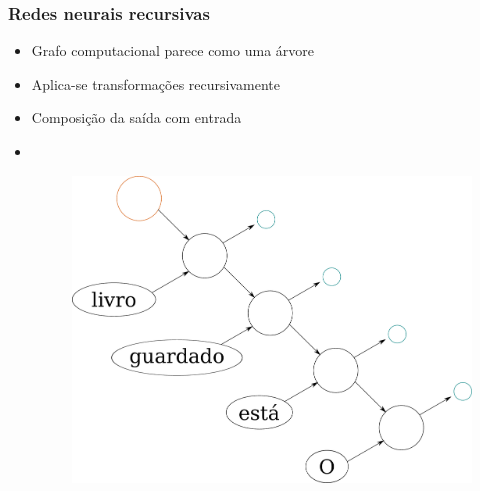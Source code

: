 \documentclass[10pt]{beamer}
\begin{document}









\begin{frame}[fragile]
  \frametitle{Redes neurais recursivas}

  \begin{itemize}
    \item Grafo computacional parece como uma árvore
  
    \item Aplica-se transformações recursivamente



    \item Composição da saída com entrada

    \item[\ ] \ 

    \begin{figure}
      \begin{center}
        \includegraphics[scale=0.25]{img/redeneuralrecursiva.pdf}
      \end{center}
    \end{figure}


  \end{itemize}

\end{frame}
\end{document}
